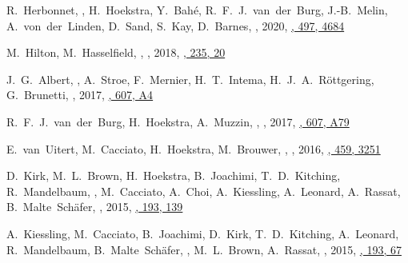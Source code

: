 
\item
R.~Herbonnet, \myself, H.~Hoekstra, Y.~Bah\'e, R.~F.~J.~van~der~Burg, J.-B.~Melin, A.~von~der~Linden, D.~Sand, S.~Kay, D.~Barnes,
,
2020, \href{https://ui.adsabs.harvard.edu/abs/2020MNRAS.497.4684H/abstract}{\mnras, 497, 4684}

\item
M.~Hilton, M.~Hasselfield, \myself, 
,
2018, \href{http://ui.adsabs.harvard.edu/abs/2018ApJS..235...20H}{\apjs, 235, 20}

\item
J.~G.~Albert, \myself, A.~Stroe, F.~Mernier, H.~T.~Intema, H.~J.~A.~R\"ottgering, 
G.~Brunetti,
,
2017, \href{http://adsabs.harvard.edu/abs/2017A&A...607A...4A}{\aap, 607, A4}

\item
R.~F.~J.~van~der~Burg, H.~Hoekstra, A.~Muzzin, \myself, 
,
2017, \href{http://adsabs.harvard.edu/abs/2017A&A...607A..79V}{\aap, 607, A79}

\item
E.~van~Uitert, M.~Cacciato, H.~Hoekstra, M.~Brouwer, \myself, 
,
2016, \href{http://adsabs.harvard.edu/abs/2016MNRAS.459.3251V}{\mnras, 459, 3251}

\item
D.~Kirk, M.~L.~Brown, H.~Hoekstra, B.~Joachimi, T.~D.~Kitching, R.~Mandelbaum, \myself, 
M.~Cacciato, A.~Choi, A.~Kiessling, A.~Leonard, A.~Rassat, B.~Malte~Sch\"afer,
,
2015, \href{http://adsabs.harvard.edu/doi/10.1007/s11214-015-0213-4}{\ssr, 193, 139}

\item
A.~Kiessling, M.~Cacciato, B.~Joachimi, D.~Kirk, T.~D.~Kitching, A.~Leonard, R.~Mandelbaum, B.~Malte~Sch\"afer, \myself, M.~L.~Brown, A.~Rassat,
,
2015, \href{http://adsabs.harvard.edu/doi/10.1007/s11214-015-0203-6}{\ssr, 193, 67}

